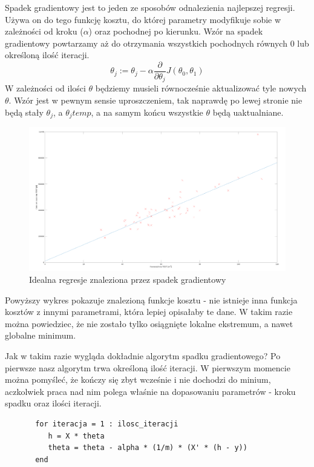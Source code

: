 \noindent
Spadek gradientowy jest to jeden ze sposobów odnalezienia najlepszej regresji. Używa on do tego funkcję kosztu, do której parametry modyfikuje sobie w zależności od kroku ($\alpha$) oraz pochodnej po kierunku. Wzór na spadek gradientowy powtarzamy aż do otrzymania wszystkich pochodnych równych 0 lub określoną ilość iteracji.
\large
$$
\theta_{j} := \theta_{j} - \alpha \frac{\partial}{\partial\theta_{j}} J(\theta_{0}, \theta_{1})
$$
\normalsize
\noindent
\newline
W zależności od ilości $\theta$ będziemy musieli równocześnie aktualizować tyle nowych $\theta$. Wzór jest w pewnym sensie uproszczeniem, tak naprawdę po lewej stronie nie będą stały $\theta_{j}$, a $\theta_{j}temp$, a na samym końcu wszystkie $\theta$ będą uaktualniane. 


	\begin{figure}[H]
    \centering
    \includegraphics[scale=0.22]{PNG/perfect_grad.png}
    \caption{Idealna regresje znaleziona przez spadek gradientowy}
    \label{lamana}
	\end{figure}
	

Powyższy wykres pokazuje znalezioną funkcje kosztu - nie istnieje inna funkcja kosztów z innymi parametrami, która lepiej opisałaby te dane. W takim razie można powiedziec, że nie zostało tylko osiągnięte lokalne ekstremum, a nawet globalne minimum.

\newpage

Jak w takim razie wygląda dokładnie algorytm spadku gradientowego? Po pierwsze nasz algorytm trwa określoną ilość iteracji. W pierwszym momencie można pomyśleć, że kończy się zbyt wcześnie i nie dochodzi do minium, aczkolwiek praca nad nim polega właśnie na dopasowaniu parametrów - kroku spadku oraz ilości iteracji.

\begin{verbatim}
	   for iteracja = 1 : ilosc_iteracji
	      h = X * theta
	      theta = theta - alpha * (1/m) * (X' * (h - y))
	   end
\end{verbatim}

